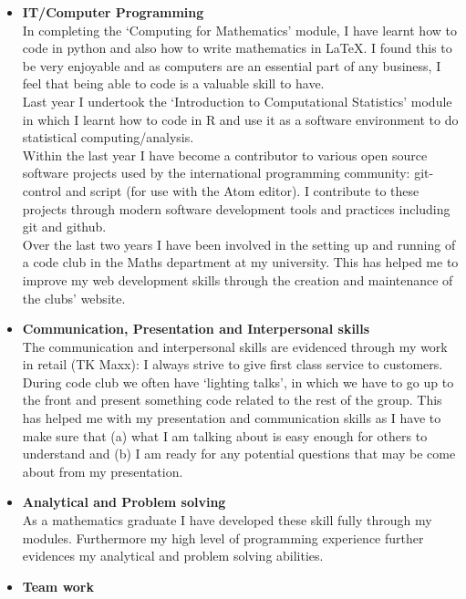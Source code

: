 \documentclass[10pt]{res}
\begin{document}
\begin{resume}
\begin{itemize}
\item \textbf{IT/Computer Programming} \\
In completing the ‘Computing for Mathematics’ module, I have learnt how to code
in python and also how to write mathematics in \LaTeX. I found this to be very
enjoyable and as computers are an essential part of any business, I feel that
being able to code is a valuable skill to have.
\\[4pt]
Last year I undertook the ‘Introduction to Computational Statistics’ module in
which I learnt how to code in R and use it as a software environment to do
statistical computing/analysis.
\\[4pt]
Within the last year I have become a contributor to various open source software
projects used by the international programming community: git-control and script
(for use with the Atom editor). I contribute to these projects through modern
software development tools and practices including git and github.
\\[4pt]
Over the last two years I have been involved in the setting up and running of a
code club in the Maths department at my university. This has helped me to
improve my web development skills through the creation and maintenance of the
clubs' website.
\\[-10pt]
\item \textbf{Communication, Presentation and Interpersonal skills} \\
The communication and interpersonal skills are evidenced through my work in
retail (TK Maxx): I always strive to give first class service to customers.
\\[4pt]
During code club we often have `lighting talks', in which we have to go
up to the front and present something code related to the rest of the group.
This has helped me with my presentation and communication skills as I have to
make sure that (a) what I am talking about is easy enough for others to
understand and (b) I am ready for any potential questions that may be come about
from my presentation.
\\[-10pt]
\item \textbf{Analytical and Problem solving} \\
As a mathematics graduate I have developed these skill fully through my
modules. Furthermore my high level of programming experience further
evidences my analytical and problem solving abilities.
\\[-10pt]
\item \textbf{Team work} \\

\end{itemize}
\end{resume}
\end{document}
